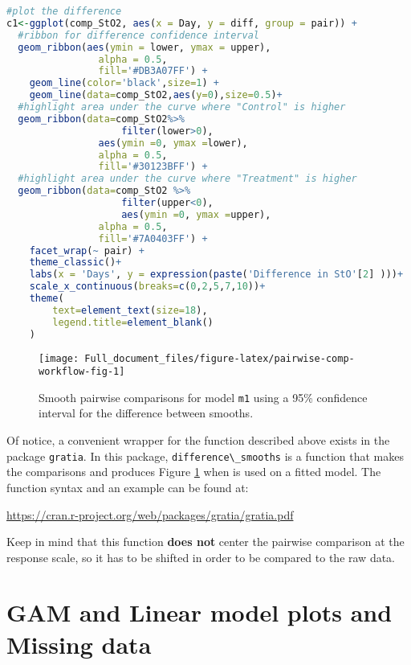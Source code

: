 \documentclass[
]{article}
\newcommand{\passthrough}[1]{#1}
\begin{document}
\begin{lstlisting}[language=R]
#plot the difference
c1<-ggplot(comp_StO2, aes(x = Day, y = diff, group = pair)) +
  #ribbon for difference confidence interval  
  geom_ribbon(aes(ymin = lower, ymax = upper),
                alpha = 0.5,
                fill='#DB3A07FF') +
    geom_line(color='black',size=1) +
    geom_line(data=comp_StO2,aes(y=0),size=0.5)+
  #highlight area under the curve where "Control" is higher
  geom_ribbon(data=comp_StO2%>%
                    filter(lower>0),
                aes(ymin =0, ymax =lower),
                alpha = 0.5,
                fill='#30123BFF') +
  #highlight area under the curve where "Treatment" is higher
  geom_ribbon(data=comp_StO2 %>%
                    filter(upper<0),
                    aes(ymin =0, ymax =upper),
                alpha = 0.5,
                fill='#7A0403FF') +
    facet_wrap(~ pair) +
    theme_classic()+
    labs(x = 'Days', y = expression(paste('Difference in StO'[2] )))+
    scale_x_continuous(breaks=c(0,2,5,7,10))+
    theme(
        text=element_text(size=18),
        legend.title=element_blank()
    )
\end{lstlisting}



\begin{figure}[H]

{\centering \texttt{[image: Full\_document\_files/figure-latex/pairwise-comp-workflow-fig-1]} 

}

\caption{Smooth pairwise comparisons for model \passthrough{\lstinline!m1!} using a 95\% confidence interval for the difference between smooths.}\label{fig:pairwise-comp-workflow-fig}
\end{figure}

Of notice, a convenient wrapper for the function described above exists in the package \passthrough{\lstinline!gratia!}. In this package, \passthrough{\lstinline!difference\_smooths!} is a function that makes the comparisons and produces Figure \ref{fig:pairwise-comp-workflow-fig} when is used on a fitted model. The function syntax and an example can be found at:

\url{https://cran.r-project.org/web/packages/gratia/gratia.pdf}

Keep in mind that this function \textbf{does not} center the pairwise comparison at the response scale, so it has to be shifted in order to be compared to the raw data.

\hypertarget{gam-and-linear-model-plots-and-missing-data}{%
\section{GAM and Linear model plots and Missing data}\label{gam-and-linear-model-plots-and-missing-data}}
\end{document}

